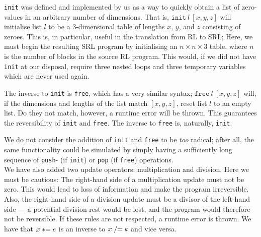 \texttt{init} was defined and implemented by us as a way to quickly obtain a list of zero-values in an arbitrary number of dimensions. That is, $\texttt{init} \ l \ [x,y,z]$ will initialise list $l$ to be a 3-dimensional table of lengths $x$, $y$, and $z$ consisting of zeroes. This is, in particular, useful in the translation from RL to SRL; Here, we must begin the resulting SRL program by initialising an $n \times n \times 3$ table, where $n$ is the number of blocks in the source RL program. This would, if we did not have \texttt{init} at our disposal, require three nested loops and three temporary variables which are never used again.

The inverse to \texttt{init} is \texttt{free}, which has a very similar syntax; $\texttt{free} \ l \ [x,y,z]$ will, if the dimensions and lengths of the list match $[x,y,z]$, reset list $l$ to an empty list. Do they not match, however, a runtime error will be thrown. This guarantees the reversibility of \texttt{init} and \texttt{free}. The inverse to \texttt{free} is, naturally, \texttt{init}.

We do not consider the addition of \texttt{init} and \texttt{free} to be \textit{too} radical; after all, the same functionality could be simulated by simply having a sufficiently long sequence of \texttt{push}- (if \texttt{init}) or \texttt{pop} (if \texttt{free}) operations.\\

\noindent We have also added two update operators: multiplication and division. Here we must be cautious: The right-hand side of a multiplication update must not be zero. This would lead to loss of information and make the program irreversible. Also, the right-hand side of a division update must be a divisor of the left-hand side --- a potential division rest would be lost, and the program would therefore not be reversible. If these rules are not respected, a runtime error is thrown. We have that $x \mathrel{*}= e$ is an inverse to $x \mathrel{/}= e$ and vice versa. \\

